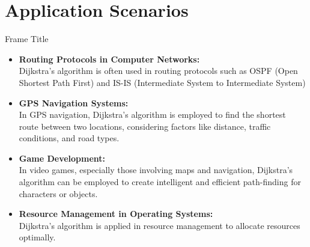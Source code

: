 \documentclass{beamer}
\begin{document}
\section{Application Scenarios}
\begin{frame}{Frame Title}
    
\begin{itemize}
    \item <1>  {\textbf{Routing Protocols in Computer Networks:} \\
    Dijkstra's algorithm is often used in routing protocols such as OSPF (Open Shortest Path First) and IS-IS (Intermediate System to Intermediate System)}
    \item <2>  {\textbf{GPS Navigation Systems:} \\ 
    In GPS navigation, Dijkstra's algorithm is employed to find the shortest route between two locations, considering factors like distance, traffic conditions, and road types.}

    \item<3>  {\textbf{Game Development: }\\ 
    In video games, especially those involving maps and navigation, Dijkstra's algorithm can be employed to create intelligent and efficient path-finding for characters or objects.}

    \item<4>  {\textbf{Resource Management in Operating Systems: }\\
    Dijkstra's algorithm is applied in resource management to allocate resources optimally.
    }

    
\end{itemize}

\end{frame}
\end{document}
